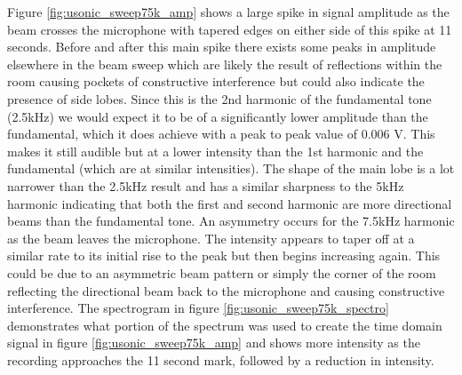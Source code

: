 Figure \ref{fig:usonic_sweep75k_amp} shows a large spike in signal amplitude as the beam crosses the microphone with tapered edges on either side of this spike at 11 seconds. Before and after this main spike there exists some peaks in amplitude elsewhere in the beam sweep which are likely the result of reflections within the room causing pockets of constructive interference but could also indicate the presence of side lobes. Since this is the 2nd harmonic of the fundamental tone (2.5kHz) we would expect it to be of a significantly lower amplitude than the fundamental, which it does achieve with a peak to peak value of 0.006 V. This makes it still audible but at a lower intensity than the 1st harmonic and the fundamental (which are at similar intensities).
The shape of the main lobe is a lot narrower than the 2.5kHz result and has a similar sharpness to the 5kHz harmonic indicating that both the first and second harmonic are more directional beams than the fundamental tone. An asymmetry occurs for the 7.5kHz harmonic as the beam leaves the microphone. The intensity appears to taper off at a similar rate to its initial rise to the peak but then begins increasing again. This could be due to an asymmetric beam pattern or simply the corner of the room reflecting the directional beam back to the microphone and causing constructive interference.
The spectrogram in figure \ref{fig:usonic_sweep75k_spectro} demonstrates what portion of the spectrum was used to create the time domain signal in figure \ref{fig:usonic_sweep75k_amp} and shows more intensity as the recording approaches the 11 second mark, followed by a reduction in intensity.